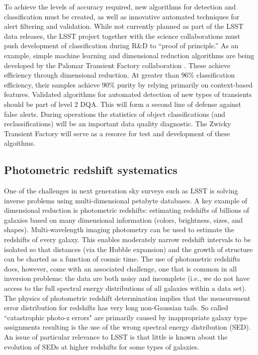 \documentclass[SE,toc,lsstdraft]{lsstdoc}
\begin{document}
To achieve the levels of accuracy required, new algorithms for detection and classification must be created, as well as innovative automated techniques for alert filtering and validation.  While not currently planned as part of the LSST data releases, the LSST project together with the science collaborations must push development of classification during R\&D to ``proof of principle.''  As an example, simple machine learning and dimensional reduction algorithms are being developed by the Palomar Transient Factory collaboration \citep{2012PASP..124.1175B}.  These achieve efficiency through dimensional reduction. At greater than 96\% classification efficiency, their samples achieve 90\% purity by relying primarily on context-based features. Validated algorithms for automated detection of new types of transients should be part of level 2 DQA.  This will form a second line of defense against false alerts. During operations the statistics of object classifications (and reclassifications) will be an important data quality diagnostic.
The Zwicky Transient Factory will serve as a resorce for test and development of these algoithms.

\subsection{Photometric redshift systematics}

One of the challenges in next generation sky surveys such as LSST is solving inverse problems using multi-dimensional petabyte databases. A key example of dimensional reduction is photometric redshifts: estimating redshifts of billions of galaxies based on many dimensional information (colors, brightness, sizes, and shapes). Multi-wavelength imaging photometry can be used to estimate the redshifts of every galaxy.  This enables moderately narrow redshift intervals to be isolated so that distances (via the Hubble expansion) and the growth of structure can be charted as a function of cosmic time.  The use of photometric redshifts does, however, come with an associated challenge, one that is common in all inversion problems: the data are both noisy and incomplete (i.e., we do not have access to the full spectral energy distributions of all galaxies within a data set). The physics of photometric redshift determination implies that the measurement error distribution for redshifts has very long non-Gaussian tails. So called ``catastrophic photo-z errors" are primarily caused by inappropriate galaxy type assignments resulting is the use of the wrong spectral energy distribution (SED). An issue of particular relevance to LSST is that little is known about the evolution of SEDs at higher redshifts for some types of galaxies.
\end{document}
